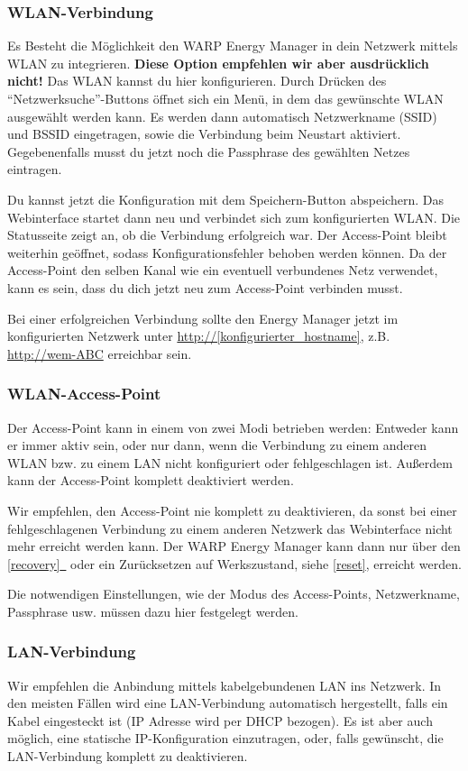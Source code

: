 \documentclass[a4paper,10pt]{article}
\newcommand{\hint}[1]{\begin{tcolorbox}[colback=boxgray,colframe=black,coltext=
white,title=Hinweis,left*=2mm,right*=2mm,boxsep=1mm,bottom=1mm,top=1mm]#1\end{tcolorbox}}
\newcommand{\gfx}[1]{\texttt{[image: \#1]}}
\newcommand*{\fullref}[1]{\hyperref[{#1}]{\ref*{#1}~\nameref*{#1}}}
\begin{document}
\begin{multicols*}{2}
	\subsubsection{WLAN-Verbindung}
	Es Besteht die Möglichkeit den WARP Energy Manager in dein Netzwerk mittels
	WLAN zu integrieren. \textbf{Diese Option empfehlen wir aber ausdrücklich
	nicht!} Das WLAN kannst du hier konfigurieren.
	Durch Drücken des \enquote{Netzwerksuche}-Buttons öffnet sich ein Menü, in dem das gewünschte WLAN ausgewählt werden kann.
	Es werden dann automatisch Netzwerkname (SSID) und BSSID eingetragen, sowie die Verbindung beim Neustart aktiviert.
	Gegebenenfalls musst du jetzt noch die Passphrase des gewählten Netzes eintragen.

	Du kannst jetzt die Konfiguration mit dem Speichern-Button abspeichern.
	Das Webinterface startet dann neu und verbindet sich zum konfigurierten WLAN. Die Statusseite zeigt
	an, ob die Verbindung erfolgreich war. Der Access-Point bleibt weiterhin
	geöffnet, sodass Konfigurationsfehler behoben werden können.
	Da der Access-Point den selben Kanal wie ein eventuell verbundenes Netz verwendet,
	kann es sein, dass du dich jetzt neu zum Access-Point verbinden musst.

	Bei einer erfolgreichen Verbindung sollte den Energy Manager jetzt im konfigurierten Netzwerk unter
	\url{http://[konfigurierter_hostname]}, z.B. \url{http://wem-ABC} erreichbar sein.

	\subsubsection{WLAN-Access-Point}
	Der Access-Point kann in einem von zwei Modi betrieben werden: Entweder kann er immer aktiv sein,
	oder nur dann, wenn die Verbindung zu einem anderen WLAN bzw. zu einem LAN nicht konfiguriert oder fehlgeschlagen ist.
	Außerdem kann der Access-Point komplett deaktiviert werden.
	\hint{Wir empfehlen, den Access-Point nie komplett zu deaktivieren, da sonst bei einer
		fehlgeschlagenen Verbindung zu einem anderen Netzwerk das Webinterface nicht mehr erreicht
		werden kann. Der WARP Energy Manager kann dann nur über den \fullref{recovery} oder ein Zurücksetzen auf Werkszustand, siehe \ref{reset}, erreicht werden.}
	Die notwendigen Einstellungen, wie der Modus des Access-Points,
	Netzwerkname, Passphrase usw. müssen dazu hier festgelegt werden.

	\subsubsection{LAN-Verbindung}
	Wir empfehlen die Anbindung mittels kabelgebundenen LAN ins Netzwerk.
	In den meisten Fällen wird eine
	LAN-Verbindung automatisch hergestellt, falls ein Kabel eingesteckt ist
	(IP Adresse wird per DHCP bezogen). Es ist aber auch möglich,
	eine statische IP-Konfiguration	einzutragen, oder, falls gewünscht, die LAN-Verbindung
	komplett zu deaktivieren.


\end{multicols*}
\end{document}
